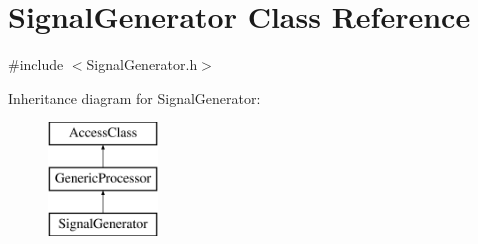 \hypertarget{classSignalGenerator}{\section{Signal\-Generator Class Reference}
\label{classSignalGenerator}
}


{\ttfamily \#include $<$Signal\-Generator.\-h$>$}

Inheritance diagram for Signal\-Generator\-:\begin{figure}[H]
\begin{center}
\leavevmode
\includegraphics[height=3.000000cm]{classSignalGenerator}
\end{center}
\end{figure}
